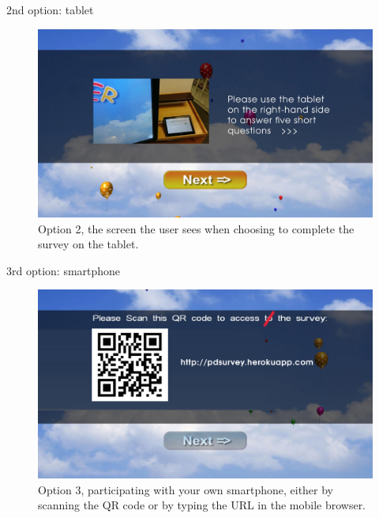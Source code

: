     2nd option: tablet

    \begin{figure}
        \begin{center}
            \includegraphics[width=\columnwidth]{img/screenshots/option-tablet.jpg}
        \end{center}
     \caption{Option 2, the screen the user sees when choosing to complete the survey on the tablet.}
     \label{screenshot:tablet-option}
    \end{figure}


    3rd option: smartphone

    \begin{figure}
        \begin{center}
            \includegraphics[width=\columnwidth]{img/screenshots/option-smartphone.jpg}
        \end{center}
     \caption{Option 3, participating with your own smartphone, either by scanning the QR code or by typing the URL in the mobile browser.}
     \label{screenshot:smartphone-option}
    \end{figure}


